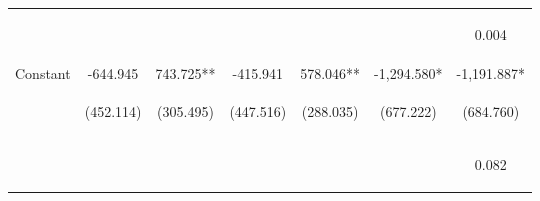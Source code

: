 \begin{center}
\begin{tabular}{lcccccc}
\vspace{4pt} & \begin{footnotesize}\end{footnotesize} & \begin{footnotesize}[0.000]\end{footnotesize} & \begin{footnotesize}[0.000]\end{footnotesize} & \begin{footnotesize}\end{footnotesize} & \begin{footnotesize}\end{footnotesize} & \begin{footnotesize}0.004\end{footnotesize} \\
Constant & -644.945 & 743.725** & -415.941 & 578.046** & -1,294.580* & -1,191.887* \\
 & \begin{footnotesize}(452.114)\end{footnotesize} & \begin{footnotesize}(305.495)\end{footnotesize} & \begin{footnotesize}(447.516)\end{footnotesize} & \begin{footnotesize}(288.035)\end{footnotesize} & \begin{footnotesize}(677.222)\end{footnotesize} & \begin{footnotesize}(684.760)\end{footnotesize} \\
 & \begin{footnotesize}[0.154]\end{footnotesize} & \begin{footnotesize}[0.015]\end{footnotesize} & \begin{footnotesize}[0.353]\end{footnotesize} & \begin{footnotesize}[0.045]\end{footnotesize} & \begin{footnotesize}[0.056]\end{footnotesize} & \begin{footnotesize}0.082\end{footnotesize} \\

\end{tabular}
\end{center}
